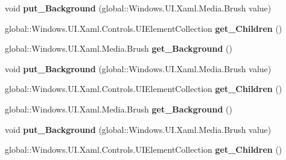 \begin{DoxyCompactItemize}
void {\bfseries put\+\_\+\+Background} (global\+::\+Windows.\+U\+I.\+Xaml.\+Media.\+Brush value)
\item 
\mbox{\label{interface_windows_1_1_u_i_1_1_xaml_1_1_controls_1_1_i_panel_a349351ef3068b2b0cb13a73833ff01df}} 
global\+::\+Windows.\+U\+I.\+Xaml.\+Controls.\+U\+I\+Element\+Collection {\bfseries get\+\_\+\+Children} ()
\item 
\mbox{\label{interface_windows_1_1_u_i_1_1_xaml_1_1_controls_1_1_i_panel_a5fbb285baf86c6114b6c3c7aa1f0395f}} 
global\+::\+Windows.\+U\+I.\+Xaml.\+Media.\+Brush {\bfseries get\+\_\+\+Background} ()
\item 
\mbox{\label{interface_windows_1_1_u_i_1_1_xaml_1_1_controls_1_1_i_panel_afeaa387907f957a8e159050c2a81c6f1}} 
void {\bfseries put\+\_\+\+Background} (global\+::\+Windows.\+U\+I.\+Xaml.\+Media.\+Brush value)
\item 
\mbox{\label{interface_windows_1_1_u_i_1_1_xaml_1_1_controls_1_1_i_panel_a349351ef3068b2b0cb13a73833ff01df}} 
global\+::\+Windows.\+U\+I.\+Xaml.\+Controls.\+U\+I\+Element\+Collection {\bfseries get\+\_\+\+Children} ()
\item 
\mbox{\label{interface_windows_1_1_u_i_1_1_xaml_1_1_controls_1_1_i_panel_a5fbb285baf86c6114b6c3c7aa1f0395f}} 
global\+::\+Windows.\+U\+I.\+Xaml.\+Media.\+Brush {\bfseries get\+\_\+\+Background} ()
\item 
\mbox{\label{interface_windows_1_1_u_i_1_1_xaml_1_1_controls_1_1_i_panel_afeaa387907f957a8e159050c2a81c6f1}} 
void {\bfseries put\+\_\+\+Background} (global\+::\+Windows.\+U\+I.\+Xaml.\+Media.\+Brush value)
\item 
\mbox{\label{interface_windows_1_1_u_i_1_1_xaml_1_1_controls_1_1_i_panel_a349351ef3068b2b0cb13a73833ff01df}} 
global\+::\+Windows.\+U\+I.\+Xaml.\+Controls.\+U\+I\+Element\+Collection {\bfseries get\+\_\+\+Children} ()

\end{DoxyCompactItemize}
